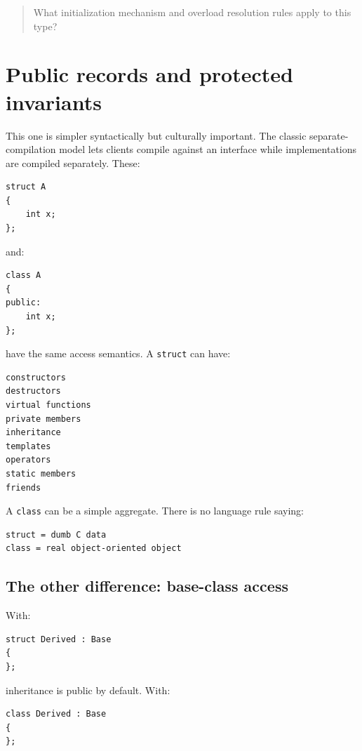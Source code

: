 \begin{quote}
What initialization mechanism and overload resolution rules apply to this type?
\end{quote}

\section{Public records and protected invariants}\label{05-engine-i-ch003-public-records-and-protected-invariants}

This one is simpler syntactically but culturally important. The classic separate-compilation model lets clients compile against an interface while implementations are compiled separately. These:

\begin{verbatim}
struct A
{
    int x;
};
\end{verbatim}

and:

\begin{verbatim}
class A
{
public:
    int x;
};
\end{verbatim}

have the same access semantics. A \texttt{struct} can have:

\begin{verbatim}
constructors
destructors
virtual functions
private members
inheritance
templates
operators
static members
friends
\end{verbatim}

A \texttt{class} can be a simple aggregate. There is no language rule saying:

\begin{verbatim}
struct = dumb C data
class = real object-oriented object
\end{verbatim}

\subsection{The other difference: base-class access}\label{05-engine-i-ch003-the-other-difference-base-class-access}

With:

\begin{verbatim}
struct Derived : Base
{
};
\end{verbatim}

inheritance is public by default. With:

\begin{verbatim}
class Derived : Base
{
};
\end{verbatim}

